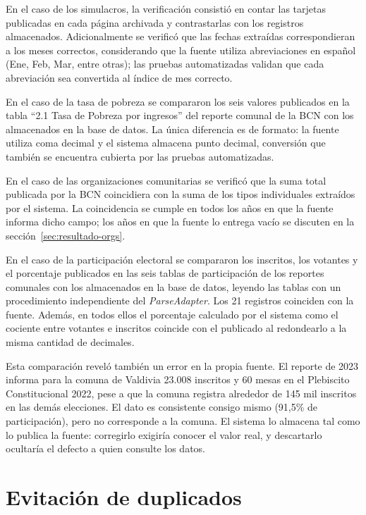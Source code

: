 \documentclass[12pt,letterpaper,oneside]{report}
\begin{document}
En el caso de los simulacros, la verificaci\'on consisti\'o en contar las tarjetas publicadas en cada p\'agina archivada y contrastarlas con los registros almacenados. Adicionalmente se verific\'o que las fechas extra\'idas correspondieran a los meses correctos, considerando que la fuente utiliza abreviaciones en espa\~nol (Ene, Feb, Mar, entre otras); las pruebas automatizadas validan que cada abreviaci\'on sea convertida al \'indice de mes correcto.

En el caso de la tasa de pobreza se compararon los seis valores publicados en la tabla ``2.1 Tasa de Pobreza por ingresos'' del reporte comunal de la BCN con los almacenados en la base de datos. La \'unica diferencia es de formato: la fuente utiliza coma decimal y el sistema almacena punto decimal, conversi\'on que tambi\'en se encuentra cubierta por las pruebas automatizadas.

En el caso de las organizaciones comunitarias se verific\'o que la suma total publicada por la BCN coincidiera con la suma de los tipos individuales extra\'idos por el sistema. La coincidencia se cumple en todos los a\~nos en que la fuente informa dicho campo; los a\~nos en que la fuente lo entrega vac\'io se discuten en la secci\'on~\ref{sec:resultado-orgs}.

En el caso de la participaci\'on electoral se compararon los inscritos, los votantes y el porcentaje publicados en las seis tablas de participaci\'on de los reportes comunales con los almacenados en la base de datos, leyendo las tablas con un procedimiento independiente del \textit{ParseAdapter}. Los 21 registros coinciden con la fuente. Adem\'as, en todos ellos el porcentaje calculado por el sistema como el cociente entre votantes e inscritos coincide con el publicado al redondearlo a la misma cantidad de decimales.

Esta comparaci\'on revel\'o tambi\'en un error en la propia fuente. El reporte de 2023 informa para la comuna de Valdivia 23.008 inscritos y 60 mesas en el Plebiscito Constitucional 2022, pese a que la comuna registra alrededor de 145 mil inscritos en las dem\'as elecciones. El dato es consistente consigo mismo (91,5\% de participaci\'on), pero no corresponde a la comuna. El sistema lo almacena tal como lo publica la fuente: corregirlo exigir\'ia conocer el valor real, y descartarlo ocultar\'ia el defecto a quien consulte los datos.

\section{Evitaci\'on de duplicados}
\label{sec:duplicados}
\end{document}
